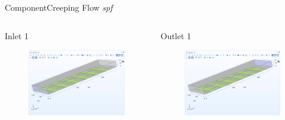 \documentclass[10pt]{beamer}
\begin{document}
\begin{frame}{Component}{Creeping Flow \textit{spf}}
    \begin{columns}[onlytextwidth]
        \begin{column}{0.5\textwidth}
            Inlet 1
            \begin{figure}[H]
                \centering
                \includegraphics[width=0.9\columnwidth]{6.png}
            \end{figure}
        \end{column}
        \begin{column}{0.5\textwidth}
            Outlet 1
            \begin{figure}[H]
                \centering
                \includegraphics[width=0.9\columnwidth]{7.png}
            \end{figure}
        \end{column}
    \end{columns}
\end{frame}
\end{document}
